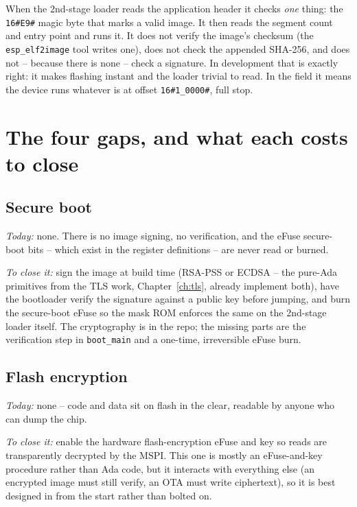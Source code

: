 When the 2nd-stage loader reads the application header it checks \emph{one} thing:
the \texttt{16\#E9\#} magic byte that marks a valid image. It then reads the segment
count and entry point and runs it. It does not verify the image's checksum (the
\texttt{esp\_elf2image} tool writes one), does not check the appended SHA-256, and
does not -- because there is none -- check a signature. In development that is
exactly right: it makes flashing instant and the loader trivial to read. In the
field it means the device runs whatever is at offset \texttt{16\#1\_0000\#}, full
stop.

\section{The four gaps, and what each costs to close}

\subsection{Secure boot}

\emph{Today:} none. There is no image signing, no verification, and the eFuse
secure-boot bits -- which exist in the register definitions -- are never read or
burned.

\emph{To close it:} sign the image at build time (RSA-PSS or ECDSA -- the pure-Ada
primitives from the TLS work, Chapter~\ref{ch:tls}, already implement both), have
the bootloader verify the signature against a public key before jumping, and burn
the secure-boot eFuse so the mask ROM enforces the same on the 2nd-stage loader
itself. The cryptography is in the repo; the missing parts are the verification step
in \texttt{boot\_main} and a one-time, irreversible eFuse burn.

\subsection{Flash encryption}

\emph{Today:} none -- code and data sit on flash in the clear, readable by anyone
who can dump the chip.

\emph{To close it:} enable the hardware flash-encryption eFuse and key so reads are
transparently decrypted by the MSPI. This one is mostly an eFuse-and-key procedure
rather than Ada code, but it interacts with everything else (an encrypted image must
still verify, an OTA must write ciphertext), so it is best designed in from the
start rather than bolted on.

